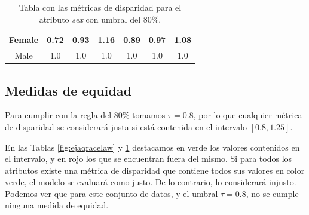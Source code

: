 \begin{table}[h]
{\begin{tabular}{ccccccc}
\multicolumn{1}{|c|}{Female}                                                             & \multicolumn{1}{c|}{{\color[HTML]{FE0000} 0.72}}                                      & \multicolumn{1}{c|}{{\color[HTML]{32CB00} 0.93}}                                        & \multicolumn{1}{c|}{{\color[HTML]{32CB00} 1.16}}                                      & \multicolumn{1}{c|}{{\color[HTML]{32CB00} 0.89}}                                      & \multicolumn{1}{c|}{{\color[HTML]{32CB00} 0.97}}                                      & \multicolumn{1}{c|}{{\color[HTML]{32CB00} 1.08}}                                      \\ \hline
\multicolumn{1}{|c|}{Male}                                                               & \multicolumn{1}{c|}{{\color[HTML]{3166FF} 1.0}}                                       & \multicolumn{1}{c|}{{\color[HTML]{3166FF} 1.0}}                                         & \multicolumn{1}{c|}{{\color[HTML]{3166FF} 1.0}}                                       & \multicolumn{1}{c|}{{\color[HTML]{3166FF} 1.0}}                                       & \multicolumn{1}{c|}{{\color[HTML]{3166FF} 1.0}}                                       & \multicolumn{1}{c|}{{\color[HTML]{3166FF} 1.0}}                                       \\ \hline
\end{tabular}
}
	\caption{Tabla con las métricas de disparidad para el atributo \textit{sex} con umbral del 80\%.}
    \label{fig:ejaqsexlaw}
\end{table}

\subsection*{Medidas de equidad}

Para cumplir con la regla del 80\% tomamos $\tau=0.8$, por lo que cualquier métrica de disparidad se considerará justa si está contenida en el intervalo $[0.8,1.25]$.

En las Tablas \ref{fig:ejaqracelaw} y \ref{fig:ejaqsexlaw} destacamos en verde los valores contenidos en el intervalo, y en rojo los que se encuentran fuera del mismo. Si para todos los atributos existe una métrica de disparidad que contiene todos sus valores en color verde, el modelo se evaluará como justo. De lo contrario, lo considerará injusto. Podemos ver que para este conjunto de datos, y el umbral $\tau=0.8$, no se cumple ninguna medida de equidad.\\

